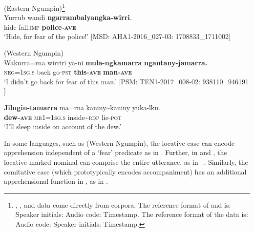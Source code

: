 \documentclass[output=paper,colorlinks,citecolor=brown]{langscibook}
\begin{document}
\ea
\textnormal{ (Eastern Ngumpin)\footnote{, , and  data come directly from corpora. The reference format of  and  is: 
Speaker initials: Audio code: Timestamp. 
The reference format of the  data is: 
Audio code: Speaker initials: Timestamp.}}\\
\gll Yurrub wandi \textbf{ngarrambalyangka-wirri}.\\
hide fall.\textsc{imp} \textbf{police-\textsc{ave}}\\
\glt `Hide, for fear of the police!'%
\small{$[$MSD: AHA1-2016\_027-03: 1708833\_1711002$]$}
\label{ex:bro15}
\z

\ea
\textnormal{ (Western Ngumpin)}\\
\gll Wakurra=rna wirriri ya-ni \textbf{mula-ngkamarra} \textbf{ngantany-jamarra.} \\
\textsc{neg=1sg.s} back go-\textsc{pst} \textbf{this-\textsc{ave}} \textbf{man-\textsc{ave}} \\
\glt `I didn't go back for fear of this man.' $[$PSM: TEN1-2017\_008-02: 938110\_946191$]$
\label{ex:bro16}
\z

\ea
{} {\citealt{richards_interactive_2012}} 
\gll \textbf{Jilngin-tamarra} ma=rna kaniny\textasciitilde kaniny yuka-lku. \\
\textbf{dew-\textsc{ave}} \textsc{mr1=1sg.s} inside\textasciitilde \textsc{rdp} lie-\textsc{pot} \\
\glt `I'll sleep inside on account of the dew.' 
\label{ex:bro17}
\z

 In some languages, such as  (Western Ngumpin), the locative case can encode apprehension independent of a `fear' predicate as in . Further, in  and , the locative-marked nominal can comprise the entire utterance, as in --. Similarly, the comitative case (which prototypically encodes accompaniment) has an additional apprehensional function in , as in .
\end{document}
